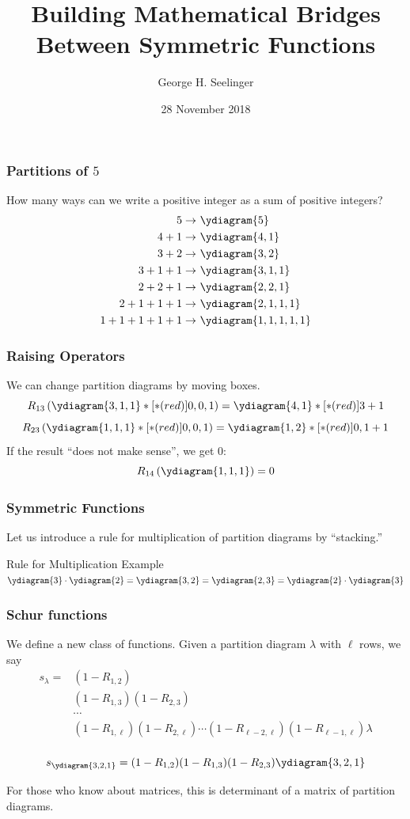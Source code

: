 \documentclass{beamer}
\title[Symmetric Functions]{Building Mathematical Bridges Between
  Symmetric Functions} %
\author[George H. Seelinger]{George H. Seelinger} %
\institute[JSF] %
{
Jefferson Scholars Foundation \\ %
\medskip
\textit{ghs9ae@virginia.edu} %
}
\date{28 November 2018} %
\begin{document}
\begin{frame}
\titlepage %
\end{frame}
\begin{frame}
  \frametitle{Partitions of \(5\)}
  How many ways can we write a positive integer as a sum of positive
  integers? \pause
    \begin{align*}
    5 \to &\ \ydiagram{5}\\
    4+1 \to &\ \ydiagram{4,1}\\
    3+2 \to &\ \ydiagram{3,2}\\
    3+1+1 \to &\ \ydiagram{3,1,1}\\
    2+2+1 \to&\ \ydiagram{2,2,1}\\
    2+1+1+1 \to&\ \ydiagram{2,1,1,1} \\
    1+1+1+1+1 \to&\ \ydiagram{1,1,1,1,1}
\end{align*}
\end{frame}
\begin{frame}
  \frametitle{Raising Operators}
  We can change partition diagrams by moving boxes.
  \[
    R_{13} \left( \ydiagram{3,1,1}*[*(red)]{0,0,1} \right) = \ydiagram{4,1}*[*(red)]{3+1}
  \]
\[
  R_{23} \left( \ydiagram{1,1,1}*[*(red)]{0,0,1} \right) = \ydiagram{1,2}*[*(red)]{0,1+1}
\]
\pause
If the result ``does not make sense'', we get \(0\): \[
  R_{14}\left( \ydiagram{1,1,1} \right) = 0
\]
\end{frame}
\begin{frame}
  \frametitle{Symmetric Functions}
  Let us introduce a rule for multiplication of partition diagrams by ``stacking.''
\begin{block}{Rule for Multiplication Example}
  \(
  \ydiagram{3} \cdot \ydiagram{2} = \ydiagram{3,2} =
  \ydiagram{2,3} = \ydiagram{2} \cdot \ydiagram{3}
  \)
\end{block}
\end{frame}
\begin{frame}
  \frametitle{Schur functions}
  We define a new class of functions. Given a partition diagram
  \(\lambda\) with 
  \(\ell\) rows, we say
  \begin{align*}
    s_\lambda = &(1-R_{1,2})\\
    &(1-R_{1,3})(1-R_{2,3})\\
    & \cdots\\
    &(1-R_{1,
      \ell})(1-R_{2,\ell})\cdots(1-R_{\ell-2,\ell})(1-R_{\ell-1,\ell})
    \lambda\\
  \end{align*}
  \begin{example}
    \[
      s_{\ydiagram{3,2,1}} = (1-R_{1,2})(1-R_{1,3})(1-R_{2,3})
      \ydiagram{3,2,1}
    \]
  \end{example}
    \pause For those who know about matrices, this is determinant of a matrix
    of partition diagrams.
\end{frame}
\end{document}
